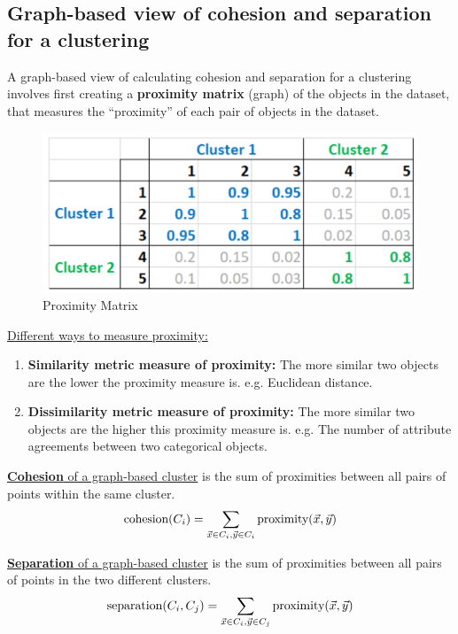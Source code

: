 \documentclass[11pt]{elegantbook}
\begin{document}
\subsection{Graph-based view of cohesion and separation for a clustering}
A graph-based view of calculating cohesion and separation for a clustering involves first creating a \textbf{proximity matrix} (graph) of the objects in the dataset, that measures the “proximity” of each pair of objects in the dataset.
\begin{center}\begin{figure}[htbp]
    \centering
    \includegraphics[scale=0.18]{proximity matrix.png}
    \caption{Proximity Matrix}
    \label{}
\end{figure}\end{center}
\underline{Different ways to measure proximity:}
\begin{enumerate}
    \item \textbf{Similarity metric measure of proximity:} The more similar two objects are the lower the proximity measure is. e.g. Euclidean distance.
    \item \textbf{Dissimilarity metric measure of proximity:} The more similar two objects are the higher this proximity measure is. e.g. The number of attribute agreements between two categorical objects.
\end{enumerate}

\underline{\textbf{Cohesion} of a graph-based cluster} is the sum of proximities between all pairs of points within the same cluster.
\begin{equation}
    \begin{aligned}
        \textnormal{cohesion}(C_i)=\sum_{\vec{x}\in C_i,\vec{y}\in C_i}\textnormal{proximity}(\vec{x},\vec{y})
    \end{aligned}
    \nonumber
\end{equation}

\underline{\textbf{Separation} of a graph-based cluster} is the sum of proximities between all pairs of points in the two different clusters.
\begin{equation}
    \begin{aligned}
        \textnormal{separation}(C_i,C_j)=\sum_{\vec{x}\in C_i,\vec{y}\in C_j}\textnormal{proximity}(\vec{x},\vec{y})
    \end{aligned}
    \nonumber
\end{equation}
\end{document}
